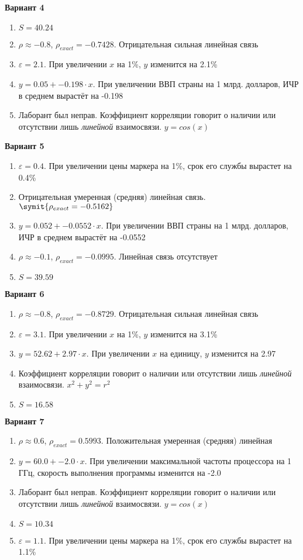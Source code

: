\documentclass{article}
\begin{document}
\textbf{Вариант 4}
\begin{enumerate}
\item $S = 40.24$
\item $\rho \approx -0.8$, $\rho_{exact} = -0.7428$. Отрицательная сильная линейная связь
\item $\varepsilon = 2.1$. При увеличении $x$ на 1\%, $y$ изменится на 2.1\%
\item $y = 0.05 + -0.198\cdot x$. При увеличении ВВП страны на 1 млрд. долларов, ИЧР в среднем вырастёт на -0.198
\item Лаборант был неправ. Коэффициент корреляции говорит о наличии или отсутствии лишь \textit{линейной} взаимосвязи. $y = cos(x)$
\end{enumerate}

\textbf{Вариант 5}
\begin{enumerate}
\item $\varepsilon = 0.4$. При увеличении цены маркера на 1\%, срок его службы вырастет на 0.4\%
\item Отрицательная умеренная (средняя) линейная связь. $\symit{\rho_{exact} = -0.5162}$
\item $y = 0.052 + -0.0552\cdot x$. При увеличении ВВП страны на 1 млрд. долларов, ИЧР в среднем вырастёт на -0.0552
\item $\rho \approx -0.1$, $\rho_{exact} = -0.0995$. Линейная связь отсутствует
\item $S = 39.59$
\end{enumerate}

\textbf{Вариант 6}
\begin{enumerate}
\item $\rho \approx -0.8$, $\rho_{exact} = -0.8729$. Отрицательная сильная линейная связь
\item $\varepsilon = 3.1$. При увеличении $x$ на 1\%, $y$ изменится на 3.1\%
\item $y = 52.62+2.97\cdot x$. При увеличении $x$ на единицу, $y$ изменится на 2.97
\item Коэффициент корреляции говорит о наличии или отсутствии лишь \textit{линейной} взаимосвязи. $x ^ 2 + y ^ 2 = r^2$
\item $S = 16.58$
\end{enumerate}

\textbf{Вариант 7}
\begin{enumerate}
\item $\rho \approx 0.6$, $\rho_{exact} = 0.5993$. Положительная умеренная (средняя) линейная
\item $y = 60.0+-2.0\cdot x$. При увеличении максимальной частоты процессора на 1 ГГц, скорость выполнения программы изменится на -2.0
\item Лаборант был неправ. Коэффициент корреляции говорит о наличии или отсутствии лишь \textit{линейной} взаимосвязи. $y = cos(x)$
\item $S = 10.34$
\item $\varepsilon = 1.1$. При увеличении цены маркера на 1\%, срок его службы вырастет на 1.1\%
\end{enumerate}
\end{document}

